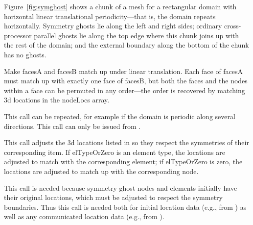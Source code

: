 Figure~\ref{fig:symghost} shows a chunk of a mesh for a 
rectangular domain with horizontal linear translational periodicity---that 
is, the domain repeats horizontally.
Symmetry ghosts lie along the left and right sides; ordinary cross-processor
parallel ghosts lie along the top edge where this chunk joins up with the
rest of the domain; and the external boundary along the bottom of the chunk
has no ghosts.




Make facesA and facesB match up under linear translation.
Each face of facesA must match up with exactly one face of
facesB, but both the faces and the nodes within a face can be
permuted in any order---the order is recovered by matching 3d locations
in the nodeLocs array.

This call can be repeated, for example if the domain is periodic along several
directions.  This call can only be issued from .




This call adjusts the 3d locations listed in  so they respect the symmetries
of their corresponding item.  If elTypeOrZero is an element type,
the locations are adjusted to match with the corresponding element;
if elTypeOrZero is zero, the locations are adjusted to match up with
the corresponding node.

This call is needed because symmetry ghost nodes and elements
initially have their original locations, which must be adjusted
to respect the symmetry boundaries.  Thus this call is needed
both for initial location data (e.g., from )
as well as any communicated location data (e.g., from
).

